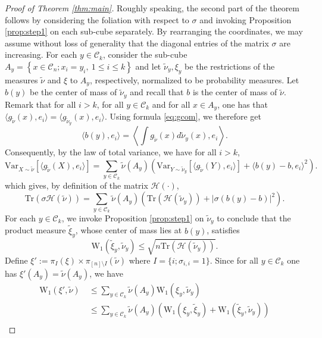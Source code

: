 \documentclass[12pt]{article}
\def \W{\mathrm{W_1}}
\def \tr {\mathrm{Tr}}
\def \DC {\mathcal{C}_n}
\def \HH {\mathcal{H}}
\theoremstyle{definition}
\theoremstyle{remark}
\begin{document}
\begin{proof}[Proof of Theorem \ref{thm:main}]
Roughly speaking, the second part of the theorem follows by considering the foliation with respect to $\sigma$ and invoking Proposition \ref{prop:step1} on each sub-cube separately. By rearranging the coordinates, we may assume without loss of generality that the diagonal entries of the matrix $\sigma$ are increasing. For each $y \in \mathcal{C}_k$, consider the sub-cube $A_y = \left \{x \in \DC; x_i=y_i, ~ 1 \leq i \leq k \right \}$ and let $\tilde \nu_y, \xi_y$ be the restrictions of the measures $\tilde \nu$ and $\xi$ to $A_y$, respectively, normalized to be probability measures. Let $b(y)$ be the center of mass of $\tilde \nu_y$ and recall that $b$ is the center of mass of $\tilde \nu$. Remark that for all $i>k$, for all $y \in \mathcal{C}_k$ and for all $x \in A_y$, one has that $\langle g_{\tilde \nu} (x), e_i \rangle = \langle g_{\tilde \nu_y}(x), e_i \rangle$. Using formula \eqref{eq:gcom}, we therefore get
$$
\langle b(y), e_i \rangle = \left \langle \int g_{\tilde \nu}(x) d \tilde \nu_y(x), e_i \right \rangle.
$$
Consequently, by the law of total variance, we have for all $i > k$,
$$
\mathrm{Var}_{X \sim \tilde \nu} \left [\langle g_{\tilde \nu}(X), e_i \rangle \right ] = \sum_{y \in \mathcal{C}_k} \tilde \nu(A_y) \left ( \mathrm{Var}_{Y \sim \tilde \nu_y} \left [ \langle g_{\tilde \nu}(Y), e_i \rangle \right ] + \langle b(y) - b, e_i \rangle^2 \right ).
$$
which gives, by definition of the matrix $\HH(\cdot)$,
\begin{equation}\label{eq:totalvariance}
\tr \left ( \sigma \HH(\tilde \nu) \right ) = \sum_{y \in \mathcal{C}_k} \tilde \nu(A_y) \left (\tr \left (\HH(\tilde \nu_y) \right ) + |\sigma(b(y) - b)|^2 \right ).
\end{equation}
For each $y \in \mathcal{C}_k$, we invoke Proposition \ref{prop:step1} on $\tilde \nu_y$ to conclude that the product measure $\tilde \xi_y$, whose center of mass lies at $b(y)$, satisfies
\begin{equation}\label{eq:distfiber}
\W(\tilde \xi_y, \tilde \nu_y) \leq \sqrt{n \tr \left (\HH(\tilde \nu_y) \right )}.
\end{equation}
Define $\xi' := \pi_I(\xi) \times \pi_{[n] \setminus I} (\tilde \nu)$ where $I = \{i; \sigma_{i,i} = 1\}$.
Since for all $y \in \mathcal{C}_k$ one has $\xi'(A_y) = \tilde \nu(A_y)$, we have
\begin{align*}
\W(\xi', \tilde \nu) ~& \leq \sum_{y \in \mathcal{C}_k} \tilde \nu(A_y) \W(\xi_y, \tilde \nu_y)  \\
& \leq \sum_{y \in \mathcal{C}_k} \tilde \nu(A_y) \left (\W(\xi_y,  \tilde \xi_y) + \W(\tilde \xi_y, \tilde \nu_y) \right ) \\

\end{align*}
\end{proof}
\end{document}
